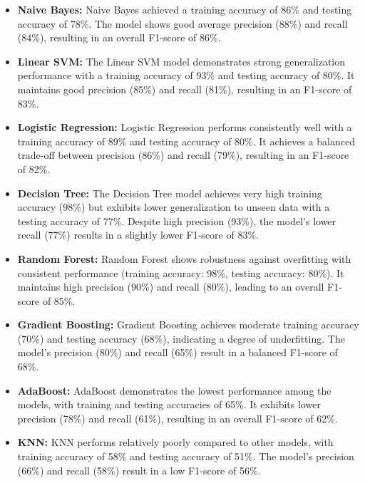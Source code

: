 \documentclass[a4paper]{article}
\theoremstyle{plain}
\theoremstyle{definition}
\begin{document}
\begin{itemize}
  \item \textbf{Naive Bayes:} Naive Bayes achieved a training accuracy of 86\% and testing accuracy of 78\%. The model shows good average precision (88\%) and recall (84\%), resulting in an overall F1-score of 86\%.
  
  \item \textbf{Linear SVM:} The Linear SVM model demonstrates strong generalization performance with a training accuracy of 93\% and testing accuracy of 80\%. It maintains good precision (85\%) and recall (81\%), resulting in an F1-score of 83\%.
  
  \item \textbf{Logistic Regression:} Logistic Regression performs consistently well with a training accuracy of 89\% and testing accuracy of 80\%. It achieves a balanced trade-off between precision (86\%) and recall (79\%), resulting in an F1-score of 82\%.
  
  \item \textbf{Decision Tree:} The Decision Tree model achieves very high training accuracy (98\%) but exhibits lower generalization to unseen data with a testing accuracy of 77\%. Despite high precision (93\%), the model's lower recall (77\%) results in a slightly lower F1-score of 83\%.
  
  \item \textbf{Random Forest:} Random Forest shows robustness against overfitting with consistent performance (training accuracy: 98\%, testing accuracy: 80\%). It maintains high precision (90\%) and recall (80\%), leading to an overall F1-score of 85\%.
  
  \item \textbf{Gradient Boosting:} Gradient Boosting achieves moderate training accuracy (70\%) and testing accuracy (68\%), indicating a degree of underfitting. The model's precision (80\%) and recall (65\%) result in a balanced F1-score of 68\%.
  
  \item \textbf{AdaBoost:} AdaBoost demonstrates the lowest performance among the models, with training and testing accuracies of 65\%. It exhibits lower precision (78\%) and recall (61\%), resulting in an overall F1-score of 62\%.
  
  \item \textbf{KNN:} KNN performs relatively poorly compared to other models, with training accuracy of 58\% and testing accuracy of 51\%. The model's precision (66\%) and recall (58\%) result in a low F1-score of 56\%.
  

\end{itemize}
\end{document}
